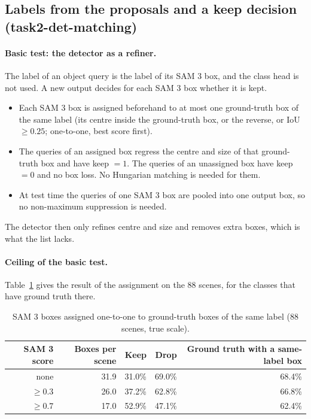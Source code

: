 \subsection{Labels from the proposals and a keep decision (task2-det-matching)}
\label{sec:vggtdet-arch-match}

\paragraph{Basic test: the detector as a refiner.}
The label of an object query is the label of its SAM 3 box, and the class head is not used. A new output decides
for each SAM 3 box whether it is kept.
\begin{itemize}
\item Each SAM 3 box is assigned beforehand to at most one ground-truth box of the same label (its centre inside
      the ground-truth box, or the reverse, or IoU $\geq 0.25$; one-to-one, best score first).
\item The queries of an assigned box regress the centre and size of that ground-truth box and have keep $=1$.
      The queries of an unassigned box have keep $=0$ and no box loss. No Hungarian matching is needed for them.
\item At test time the queries of one SAM 3 box are pooled into one output box, so no non-maximum suppression is
      needed.
\end{itemize}
The detector then only refines centre and size and removes extra boxes, which is what the list lacks.

\paragraph{Ceiling of the basic test.}
Table~\ref{tab:arch-keep} gives the result of the assignment on the 88 scenes, for the classes that have
ground truth there.

\begin{table}[t]
\centering
\caption{SAM 3 boxes assigned one-to-one to ground-truth boxes of the same label (88 scenes, true scale).}
\label{tab:arch-keep}
\begin{tabular}{rrrrr}
\toprule
SAM 3 score & Boxes per scene & Keep & Drop & Ground truth with a same-label box \\
\midrule
none       & 31.9 & 31.0\% & 69.0\% & 68.4\% \\
$\geq 0.3$ & 26.0 & 37.2\% & 62.8\% & 66.8\% \\
$\geq 0.7$ & 17.0 & 52.9\% & 47.1\% & 62.4\% \\
\bottomrule
\end{tabular}
\end{table}

